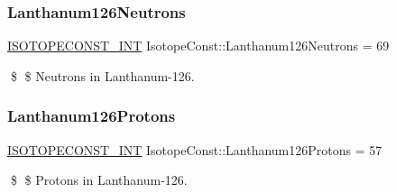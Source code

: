 \subsubsection{\texorpdfstring{Lanthanum126\+Neutrons}{Lanthanum126Neutrons}}
{\footnotesize\ttfamily \mbox{\hyperlink{group___isotope_const-_macros_ga5f18360b3e99483a35c32d789e62621c}{I\+S\+O\+T\+O\+P\+E\+C\+O\+N\+S\+T\+\_\+\+I\+NT}} Isotope\+Const\+::\+Lanthanum126\+Neutrons = 69}

\$ \$ Neutrons in Lanthanum-\/126. \mbox{\label{group___isotope_const-_lanthanum-_la126_gae426f1951cf98ed40156afc822a5f88a}} 
\subsubsection{\texorpdfstring{Lanthanum126\+Protons}{Lanthanum126Protons}}
{\footnotesize\ttfamily \mbox{\hyperlink{group___isotope_const-_macros_ga5f18360b3e99483a35c32d789e62621c}{I\+S\+O\+T\+O\+P\+E\+C\+O\+N\+S\+T\+\_\+\+I\+NT}} Isotope\+Const\+::\+Lanthanum126\+Protons = 57}

\$ \$ Protons in Lanthanum-\/126. 